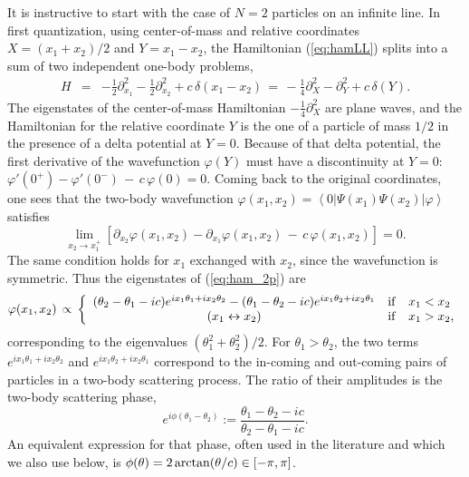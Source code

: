 \documentclass[onecolumn,amsfonts,showpacs,superscriptaddress]{revtex4-1}
\begin{document}
It is instructive to start with the case of $N=2$ particles on an infinite line. In first quantization, using center-of-mass and relative coordinates $X = (x_1+x_2)/2$ and $Y = x_1-x_2$, the Hamiltonian (\ref{eq:hamLL}) splits into a sum of two independent one-body problems,
\begin{eqnarray}
	\label{eq:ham_2p}
	H &=& -\frac{1}{2} \partial_{x_1}^2 - \frac{1}{2} \partial_{x_2}^2 + c \, \delta(x_1-x_2)  \, = \,  -\frac{1}{4}  \partial_X^2 -  \partial_Y^2  + c \, \delta(Y)  .
\end{eqnarray}
The eigenstates of the center-of-mass Hamiltonian $-\frac{1}{4} \partial_X^2$ are plane waves, and the Hamiltonian for the relative coordinate $Y$ is the one of a particle of mass $1/2$ in the presence of a delta potential at $Y=0$. Because of that delta potential, the first derivative of the wavefunction $\varphi(Y)$ must have a discontinuity at $Y=0$: $ \varphi'(0^+) - \varphi'(0^-)   \, - \, c \, \varphi(0)  = 0$. Coming back to the original coordinates, one sees that the two-body wavefunction $\varphi(x_1,x_2) = \left<  0\right| \Psi(x_1) \Psi(x_2) \left| \varphi \right>$ satisfies
\begin{equation}
	\label{eq:singularity}
	\lim_{x_2 \rightarrow x_1^+} \left[  \partial_{x_2} \varphi(x_1,x_2) - \partial_{x_1} \varphi(x_1,x_2)  \, - \, c \,  \varphi(x_1,x_2) \right]  = 0 .
\end{equation}
The same condition holds for $x_1$ exchanged with $x_2$, since the wavefunction is symmetric. Thus the eigenstates of (\ref{eq:ham_2p}) are
\begin{equation}
	\label{eq:2bd_wf}
	\varphi (x_1,x_2) \, \propto \, \left\{\begin{array}{ccl}
		(\theta_2 - \theta_1 - i c)  e^{i x_1 \theta_1 + i x_2 \theta_2} - (\theta_1 - \theta_2 - i c)  e^{i  x_1 \theta_2 + i x_2 \theta_1} &{\rm if} & x_1 < x_2  \\
		(x_1 \leftrightarrow x_2)  &{\rm if} & x_1 > x_2 ,
	\end{array} \right.
\end{equation}
corresponding to the eigenvalues $(\theta_1^2+\theta_2^2)/2$. For $\theta_1 > \theta_2$, the two terms $e^{i x_1 \theta_1 + i x_2 \theta_2}$ and $e^{i x_1 \theta_2 + i x_2 \theta_1}$ correspond to the in-coming and out-coming pairs of particles in a two-body scattering process. The ratio of their amplitudes is the two-body scattering phase,
\begin{equation}
	\label{eq:2bd_scattering_phase}
	e^{i \phi (\theta_1 - \theta_2)} := \frac{\theta_1 - \theta_2 - i c}{\theta_2 - \theta_1 - i c} .
\end{equation}
An equivalent expression for that phase, often used in the literature and which we also use below, is $\phi (\theta) = 2 \, {\rm arctan} (\theta/c) \in [-\pi,\pi]$.
\end{document}
